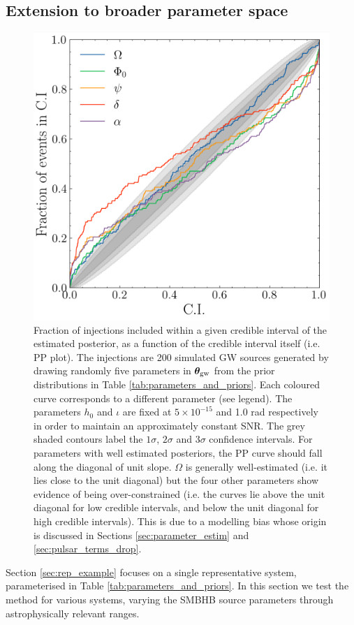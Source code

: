 \documentclass[fleqn,usenatbib,useAMS]{mnras}
\begin{document}
\subsection{Extension to broader parameter space} \label{sec:parameter_space}
\begin{figure}
	\centering
	\includegraphics[width=\columnwidth]{images/pp_plot_new1}
	\caption{Fraction of injections included within a given credible interval of the estimated posterior, as a function of the credible interval itself (i.e. PP plot). The injections are 200 simulated GW sources generated by drawing randomly five parameters in $\boldsymbol{\theta}_{\rm gw}$ from the prior distributions in Table \ref{tab:parameters_and_priors}. Each coloured curve corresponds to a different parameter (see legend). The parameters $h_0$ and $\iota$ are fixed at $5 \times 10^{-15}$ and 1.0 rad respectively in order to maintain an approximately constant SNR. The grey shaded contours label the $1\sigma$, $2\sigma$ and 3$\sigma$ confidence intervals. For parameters with well estimated posteriors, the PP curve should fall along the diagonal of unit slope. $\Omega$ is generally well-estimated (i.e. it lies close to the unit diagonal) but the four other parameters show evidence of being over-constrained (i.e. the curves lie above the unit diagonal for low credible intervals, and below the unit diagonal for high credible intervals). This is due to a modelling bias whose origin is discussed in Sections \ref{sec:parameter_estim} and \ref{sec:pulsar_terms_drop}.}
	\label{fig:parameter_space}
\end{figure}
Section \ref{sec:rep_example} focuses on a single representative system, parameterised in Table \ref{tab:parameters_and_priors}. In this section we test the method for various systems, varying the SMBHB source parameters through astrophysically relevant ranges. \newline 
\end{document}
